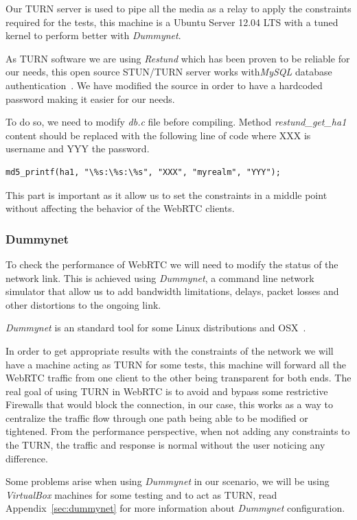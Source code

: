 Our TURN server is used to pipe all the media as a relay to apply the constraints required for the tests, this machine is a Ubuntu Server 12.04 LTS with a tuned kernel to perform better with {\it Dummynet}.

As TURN software we are using {\it Restund} which has been proven to be reliable for our needs, this open source STUN/TURN server works with{\it MySQL} database authentication~\cite{http://www.creytiv.com/restund.html}. We have modified the source in order to have a hardcoded password making it easier for our needs.

To do so, we need to modify {\it db.c} file before compiling. Method {\it restund\_get\_ha1} content should be replaced with the following line of code where XXX is username and YYY the password.

\begin{lstlisting}
md5_printf(ha1, "\%s:\%s:\%s", "XXX", "myrealm", "YYY");
\end{lstlisting}

This part is important as it allow us to set the constraints in a middle point without affecting the behavior of the WebRTC clients.

\subsubsection{Dummynet}

To check the performance of WebRTC we will need to modify the status of the network link. This is achieved using {\it Dummynet}, a command line network simulator that allow us to add bandwidth limitations, delays, packet losses and other distortions to the ongoing link.

{\it Dummynet} is an standard tool for some Linux distributions and OSX~\cite{dummynetTool}.

In order to get appropriate results with the constraints of the network we will have a machine acting as TURN for some tests, this machine will forward all the WebRTC traffic from one client to the other being transparent for both ends. The real goal of using TURN in WebRTC is to avoid and bypass some restrictive Firewalls that would block the connection, in our case, this works as a way to centralize the traffic flow through one path being able to be modified or tightened. From the performance perspective, when not adding any constraints to the TURN, the traffic and response is normal without the user noticing any difference.

Some problems arise when using {\it Dummynet} in our scenario, we will be using {\it VirtualBox} machines for some testing and to act as TURN, read Appendix~\ref{sec:dummynet} for more information about {\it Dummynet} configuration.

